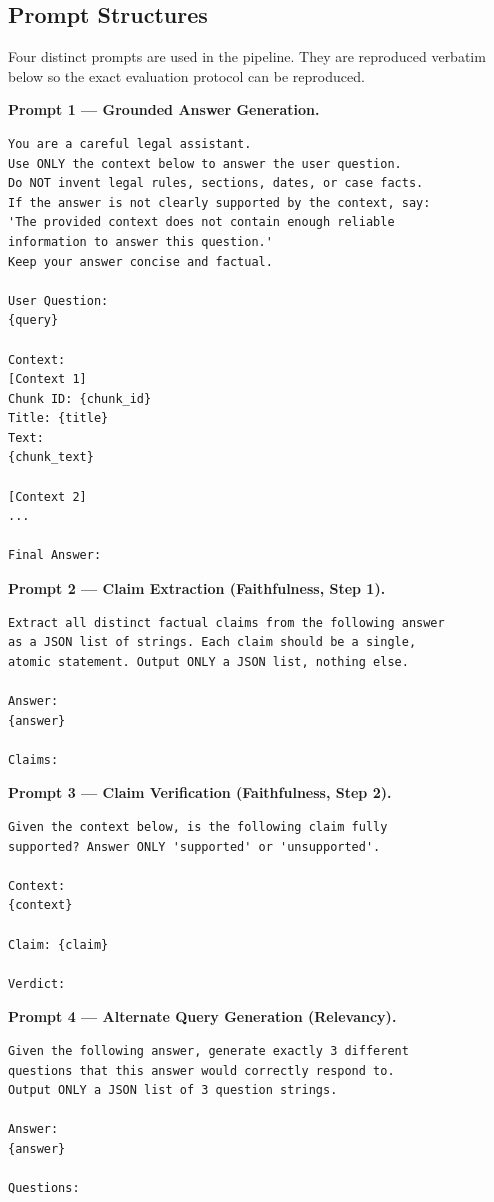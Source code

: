 \documentclass[11pt,a4paper]{article}
\newcommand{\promptheading}[1]{%
    \par\vspace{1.2em}%
    \noindent\textbf{#1}\par%
    \nopagebreak\vspace{0.4em}%
    \nopagebreak
}
\begin{document}
\subsection{Prompt Structures}

Four distinct prompts are used in the pipeline. They are reproduced verbatim below so the exact evaluation protocol can be reproduced.

\promptheading{Prompt 1 --- Grounded Answer Generation.}
\begin{lstlisting}[language=promptlang]
You are a careful legal assistant.
Use ONLY the context below to answer the user question.
Do NOT invent legal rules, sections, dates, or case facts.
If the answer is not clearly supported by the context, say:
'The provided context does not contain enough reliable
information to answer this question.'
Keep your answer concise and factual.

User Question:
{query}

Context:
[Context 1]
Chunk ID: {chunk_id}
Title: {title}
Text:
{chunk_text}

[Context 2]
...

Final Answer:
\end{lstlisting}

\promptheading{Prompt 2 --- Claim Extraction (Faithfulness, Step 1).}
\begin{lstlisting}[language=promptlang]
Extract all distinct factual claims from the following answer
as a JSON list of strings. Each claim should be a single,
atomic statement. Output ONLY a JSON list, nothing else.

Answer:
{answer}

Claims:
\end{lstlisting}

\promptheading{Prompt 3 --- Claim Verification (Faithfulness, Step 2).}
\begin{lstlisting}[language=promptlang]
Given the context below, is the following claim fully
supported? Answer ONLY 'supported' or 'unsupported'.

Context:
{context}

Claim: {claim}

Verdict:
\end{lstlisting}

\promptheading{Prompt 4 --- Alternate Query Generation (Relevancy).}
\begin{lstlisting}[language=promptlang]
Given the following answer, generate exactly 3 different
questions that this answer would correctly respond to.
Output ONLY a JSON list of 3 question strings.

Answer:
{answer}

Questions:
\end{lstlisting}
\end{document}
